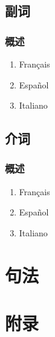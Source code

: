 \documentclass[UTF8,a4paper,titlepage,10pt]{report}
\begin{document}
\chapter{副词}
\label{sec:orgc83cdac}

\section{概述}
\label{sec:orgfb668ae}

\begin{enumerate}
\item Français
\label{sec:orgb91f793}

\item Español
\label{sec:org1e3328c}

\item Italiano
\label{sec:org0d7fe10}
\end{enumerate}

\chapter{介词}
\label{sec:orgacd5b28}

\section{概述}
\label{sec:org0fa842d}

\begin{enumerate}
\item Français
\label{sec:org535551b}

\item Español
\label{sec:org81242e2}

\item Italiano
\label{sec:org913365a}
\end{enumerate}

\part{句法}
\label{sec:org5ba3240}

\newpage
\part{附录}
\label{sec:orge5a2624}

\listoftables

\listoffigures

\printindex
\end{document}
